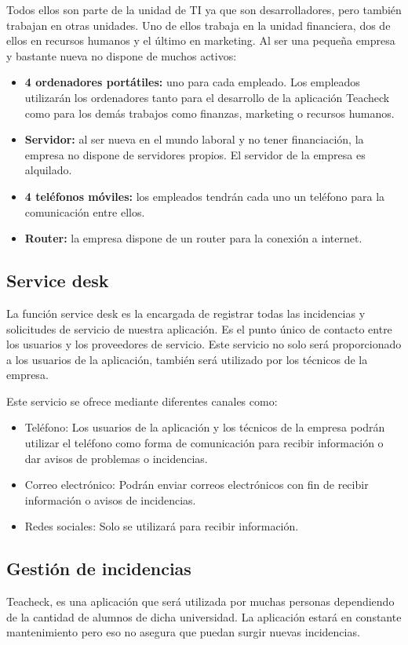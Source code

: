 Todos ellos son parte de la unidad de TI ya que son desarrolladores, pero también trabajan en otras unidades. Uno de ellos trabaja en la unidad financiera, dos de ellos en recursos humanos y el último en marketing.
Al ser una pequeña empresa y bastante nueva no dispone de muchos activos:
\begin{itemize}
\item{\textbf{4 ordenadores portátiles: }}uno para cada empleado.  Los empleados utilizarán los ordenadores tanto para el desarrollo de la aplicación Teacheck como para los demás trabajos como finanzas, marketing o recursos humanos.
\item{\textbf{Servidor: }}al ser nueva en el mundo laboral y no tener financiación, la empresa no dispone de servidores propios. El servidor de la empresa es alquilado.
\item{\textbf{4 teléfonos móviles: }}los empleados tendrán cada uno un teléfono para la comunicación entre ellos.
\item{\textbf{Router: }}la empresa dispone de un router para la conexión a internet.

\end{itemize}
\subsection{Service desk}
La función service desk es la encargada de registrar todas las
incidencias y solicitudes de servicio de nuestra aplicación. Es el
punto único de contacto entre los usuarios y los proveedores de
servicio. Este servicio no solo será proporcionado a los usuarios de
la aplicación, también será utilizado por los técnicos de la empresa.

Este servicio se ofrece mediante diferentes canales como:
\begin{itemize}
\item{Teléfono: }Los usuarios de la aplicación y los técnicos de la
  empresa podrán utilizar el teléfono como forma de comunicación para
  recibir información o dar avisos de problemas o incidencias.
\item{Correo electrónico: }Podrán enviar correos electrónicos con fin
  de recibir información o avisos de incidencias.
\item{Redes sociales: }Solo se utilizará para recibir información.
\end{itemize}
\subsection{Gestión de incidencias}
Teacheck, es una aplicación que será utilizada por muchas personas
dependiendo de la cantidad de alumnos de dicha universidad. La
aplicación estará en constante mantenimiento pero eso no asegura que
puedan surgir nuevas incidencias.

